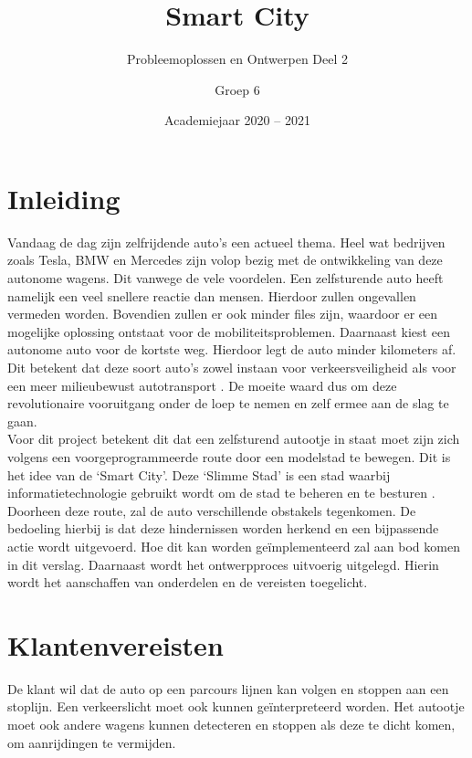 \documentclass[a4paper,twoside,kulak]{kulakreport} %
\title{Smart City}
\subtitle{Probleemoplossen en Ontwerpen Deel 2}
\author{Groep 6}
\institute {Aaron Vandenberghe, Dieter Demuynck, Jolien Barbier\\  
	Mathis Bossuyt, Rani Jans en Sarah De Meester \\~\\ 
	o.l.v. Benjamin Maveau Kevin Truyaert en Martijn Boussé}
\date{Academiejaar 2020 -- 2021}
\begin{document}

\titlepage 
\tableofcontents
\renewcommand\thesection{\arabic{section}}
\renewcommand\thesubsection{\thesection.\arabic{subsection}}
\newpage
\section*{Inleiding}\label{Inleiding}
Vandaag de dag zijn zelfrijdende auto's een actueel thema. Heel wat bedrijven zoals Tesla, BMW en Mercedes zijn volop bezig met de ontwikkeling van deze autonome wagens. Dit vanwege de vele voordelen. Een zelfsturende auto heeft namelijk een veel snellere reactie dan mensen. Hierdoor zullen ongevallen vermeden worden. Bovendien zullen er ook minder files zijn, waardoor er een mogelijke oplossing ontstaat voor de mobiliteitsproblemen. Daarnaast kiest een autonome auto voor de kortste weg. Hierdoor legt de auto minder kilometers af. Dit betekent dat deze soort auto's zowel instaan voor verkeersveiligheid als voor een meer milieubewust autotransport \cite{AutonomeAutos1, AutonomeAutos2}. De moeite waard dus om deze revolutionaire vooruitgang onder de loep te nemen en zelf ermee aan de slag te gaan.\\
Voor dit project betekent dit dat een zelfsturend autootje in staat moet zijn zich volgens een voorgeprogrammeerde route door een modelstad te bewegen. Dit is het idee van de `Smart City'. Deze `Slimme Stad' is een stad waarbij informatietechnologie gebruikt wordt om de stad te beheren en te besturen \cite{SmartCity}. Doorheen deze route, zal de auto verschillende obstakels tegenkomen. De bedoeling hierbij is dat deze hindernissen worden herkend en een bijpassende actie wordt uitgevoerd. Hoe dit kan worden geïmplementeerd zal aan bod komen in dit verslag. Daarnaast wordt het ontwerpproces uitvoerig uitgelegd. Hierin wordt het aanschaffen van onderdelen en de vereisten toegelicht.


\section{Klantenvereisten} \label{Klantenvereisten}
De klant wil dat de auto op een parcours lijnen kan volgen en stoppen aan een stoplijn. Een verkeerslicht moet ook kunnen geïnterpreteerd worden. Het autootje moet ook andere wagens kunnen detecteren en stoppen als deze te dicht komen, om aanrijdingen te vermijden.
\end{document}
